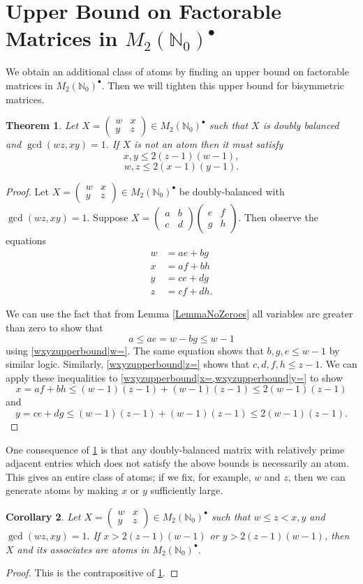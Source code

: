 \documentclass{amsart}
\newcommand{\pmx}[4]{\begin{pmatrix} #1 & #2 \\ #3 & #4 \end{pmatrix}}
\newcommand{\mtwo}{M_2(\mathbb{N}_0)^\bullet}
\newtheorem{theorem}{Theorem}[section]
\newtheorem{cor}[theorem]{Corollary}
\begin{document}
\section{Upper Bound on Factorable Matrices in $\mtwo$}\label{sec: upper bound}


We obtain an additional class of atoms by finding an upper bound on factorable matrices in $\mtwo$. Then we will tighten this upper bound for bisymmetric matrices.


\begin{theorem}\label{wxyzupperbound2} Let $X=\pmx{w}{x}{y}{z}\in \mtwo$ such that 
$X$ is doubly balanced and $\gcd(wz, xy)=1.$ If $X$ is not an atom then it must satisfy
$$x,y\le2(z-1)(w-1),$$
$$w, z \leq 2(x-1)(y-1).$$
\end{theorem}
\begin{proof}
    Let $X=\pmx{w}{x}{y}{z}\in \mtwo$ be doubly-balanced with $\gcd(wz, xy)=1.$ Suppose $X=\pmx{a}{b}{c}{d}\pmx{e}{f}{g}{h}.$ Then observe the equations
    \begin{align}
        w&=ae+bg \label{wxyzupperbound|w=}\\
        x&=af+bh \label{wxyzupperbound|x=} \\
        y&=ce+dg \label{wxyzupperbound|y=} \\
        z&=cf+dh \label{wxyzupperbound|z=}.   
    \end{align}


We can use the fact that from Lemma \ref{LemmaNoZeroes} all variables are greater than zero  to show that
$$a\le ae=w-bg \le w-1$$ using \cref{wxyzupperbound|w=}.  The same equation shows that $b,g,e\le w-1$ by similar logic. Similarly, \cref{wxyzupperbound|z=} shows that $c,d,f,h\le z-1$. We can apply these inequalities to \cref{wxyzupperbound|x=,wxyzupperbound|y=} to show 
   $$x=af+bh \le (w-1)(z-1)+(w-1)(z-1) \le 2(w-1)(z-1)$$
and 
$$y=ce+dg \le (w-1)(z-1)+(w-1)(z-1) \le 2(w-1)(z-1).$$
\end{proof}

One consequence of \cref{wxyzupperbound2} is that any doubly-balanced matrix with relatively prime adjacent entries which does not satisfy the above bounds is necessarily an atom. This gives an entire class of atoms; if we fix, for example, $w$ and $z$, then we can generate atoms by making $x$ or $y$ sufficiently large.

\begin{cor}\label{cor: upper bound atoms}
    Let $X=\pmx{w}{x}{y}{z}\in \mtwo$ such that $w\le z<x,y$ and $\gcd(wz, xy)=1.$ If $x>2(z-1)(w-1)$ or $y>2(z-1)(w-1)$, then $X$ and its associates are atoms in $\mtwo$.
\end{cor}
\begin{proof}
This is the contrapositive of \cref{wxyzupperbound2}.
\end{proof}
\end{document}
